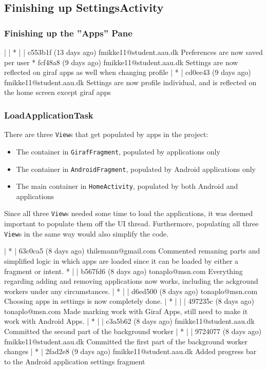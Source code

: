 \subsection{Finishing up SettingsActivity}

\subsubsection{Finishing up the ''Apps'' Pane}
| | * | | c553b1f (13 days ago) fmikke11@student.aau.dk Preferences are now saved per user
* fcf48a8 (9 days ago) fmikke11@student.aau.dk Settings are now reflected on giraf apps as well when changing profile
| * | cd0ee43 (9 days ago) fmikke11@student.aau.dk Settings are now profile individual, and is reflected on the home screen except giraf apps

\subsubsection{LoadApplicationTask}
There are three \lstinline!View!s that get populated by apps in the \launcher project:

\begin{itemize}
\item The container in \lstinline!GirafFragment!, populated by \giraf applications only
\item The container in \lstinline!AndroidFragment!, populated by Android applications only
\item The main container in \lstinline!HomeActivity!, populated by both Android and \giraf applications
\end{itemize}

Since all three \lstinline!View!s needed some time to load the applications, it was deemed important to populate them off the UI thread.
Furthermore, populating all three \lstinline!View!s in the same way would also simplify the code.

| * | 63c0ca5 (8 days ago) thilemann@gmail.com Commented remaning parts and simplified logic in which apps are loaded since it can be loaded by either a fragment or intent.
* | | b567fd6 (8 days ago) tonaplo@msn.com Everything regarding adding and removing applications now works, including the ackground workers under any circumstances.
| * | | d6ed500 (8 days ago) tonaplo@msn.com Choosing apps in settings is now completely done.
| * | | | 497235c (8 days ago) tonaplo@msn.com Made marking work with Giraf Apps, still need to make it work with Android Apps.
| * | | c3a5b62 (8 days ago) fmikke11@student.aau.dk Committed the second part of the background worker
| * | | 9724077 (8 days ago) fmikke11@student.aau.dk Committed the first part of the background worker changes
| * | 2fad2e8 (9 days ago) fmikke11@student.aau.dk Added progress bar to the Android application settings fragment

